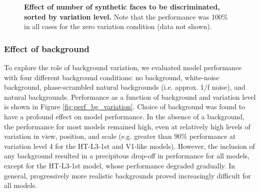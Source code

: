 \begin{figure}[ht]
{  \label{fig:nfaces_var4}
}

\caption[]{{\bf Effect of number of synthetic faces to be discriminated, sorted by variation level.} Note that the performance was 100\% in all cases for the zero variation condition (data not shown).}
\label{fig:nfaces_by_variation}
\end{figure}


\subsubsection{Effect of background}

To explore the role of background variation, we evaluated model performance with four different background conditions: no background, white-noise background, phase-scrambled natural backgrounds (i.e. approx. 1/f noise), and natural backgrounds.  Performance as a function of background and variation level is shown in Figure \ref{fig:perf_bg_variation}.  Choice of background was found to have a profound effect on model performance.  In the absence of a background, the performance for most models remained high, even at relatively high levels of variation in view, position, and scale (e.g. greater than 90\% performance at variation level 4 for the HT-L3-1st and V1-like models).  However, the inclusion of any background resulted in a precipitous drop-off in performance for all models, except for the HT-L3-1st model, whose performance degraded gradually.  In general, progressively more realistic backgrounds proved increasingly difficult for all models.

